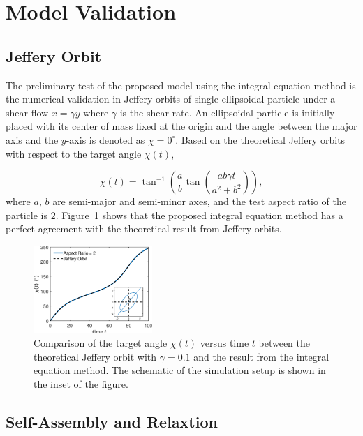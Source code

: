 \documentclass[lineno]{jfm}
\begin{document}


\section{\label{validation}Model Validation}

\subsection{Jeffery Orbit}


The preliminary test of the proposed model using the integral equation method is the numerical validation in Jeffery orbits of single ellipsoidal particle under a shear flow $\dot x = \dot\gamma y$ where $\dot\gamma$ is the shear rate. An ellipsoidal particle is initially placed with its center of mass fixed at the origin and the angle between the major axis and the $y$-axis is denoted as $\chi = 0^\circ$. Based on the theoretical Jeffery orbits with respect to the target angle $\chi(t)$, 

\begin{equation}
\chi(t) = \tan^{-1}\left(\frac{a}{b}\tan \left(\frac{ab \dot\gamma t}{a^2+b^2}\right)\right),
\end{equation}
%
where $a$, $b$ are semi-major and semi-minor axes, and the test aspect ratio of the particle is $2$. Figure~\ref{figure1} shows that the proposed integral equation method has a perfect agreement with the theoretical result from Jeffery orbits.


\begin{figure}
\centering
\includegraphics[width=0.4\textwidth]{JefferyOrbit.eps}
  \caption{Comparison of the target angle $\chi(t)$ versus time $t$ between the theoretical Jeffery orbit with $\dot\gamma=0.1$ and the result from the integral equation method. The schematic of the simulation setup is shown in the inset of the figure.
  }
    \label{figure1}
\end{figure}

\subsection{Self-Assembly and Relaxtion}
\end{document}
